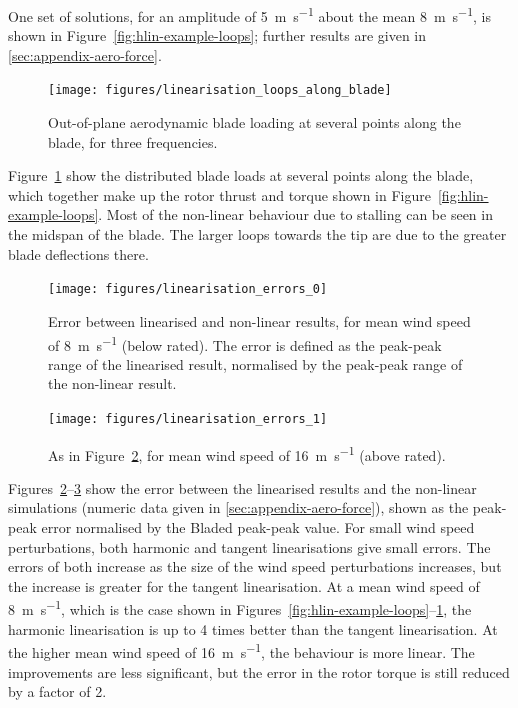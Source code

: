 \documentclass[a4paper,preprint]{elsarticle}
\begin{document}
One set of solutions, for an amplitude of \SI{5}{\metre\per\second} about the
mean \SI{8}{\metre\per\second}, is shown in Figure~\ref{fig:hlin-example-loops};
further results are given in \ref{sec:appendix-aero-force}.

\begin{figure}
  \centering
  \texttt{[image: figures/linearisation\_loops\_along\_blade]}
  \caption{Out-of-plane aerodynamic blade loading at several points
    along the blade, for three frequencies.}
\label{fig:hlin-example-bladeloads}
\end{figure}

Figure~\ref{fig:hlin-example-bladeloads} show the distributed blade loads at
several points along the blade, which together make up the rotor thrust and
torque shown in Figure~\ref{fig:hlin-example-loops}. Most of the non-linear
behaviour due to stalling can be seen in the midspan of the blade. The larger
loops towards the tip are due to the greater blade deflections there.

\begin{figure}[p]
  \centering
  \hspace*{-1.5cm}\texttt{[image: figures/linearisation\_errors\_0]}
  \caption{Error between linearised and non-linear results, for mean
    wind speed of \SI{8}{\metre\per\second} (below rated). The error
    is defined as the peak-peak range of the linearised result,
    normalised by the peak-peak range of the non-linear result.}
\label{fig:hlin-errors-rms-1}
\end{figure}
\begin{figure}[p]
  \centering
  \hspace*{-1.5cm}\texttt{[image: figures/linearisation\_errors\_1]}
  \caption{As in Figure~\ref{fig:hlin-errors-rms-1}, for mean wind speed of
    \SI{16}{\metre\per\second} (above rated).}
\label{fig:hlin-errors-rms-2}
\end{figure}

Figures~\ref{fig:hlin-errors-rms-1}--\ref{fig:hlin-errors-rms-2} show the error
between the linearised results and the non-linear simulations (numeric data given
in \ref{sec:appendix-aero-force}), shown as the peak-peak error normalised by
the Bladed peak-peak value. For small wind speed perturbations, both harmonic
and tangent linearisations give small errors. The errors of both increase as the
size of the wind speed perturbations increases, but the increase is greater for
the tangent linearisation. At a mean wind speed of \SI{8}{\metre\per\second},
which is the case shown in
Figures~\ref{fig:hlin-example-loops}--\ref{fig:hlin-example-bladeloads}, the
harmonic linearisation is up to \num{4} times better than the tangent
linearisation. At the higher mean wind speed of \SI{16}{\metre\per\second}, the
behaviour is more linear. The improvements are less significant, but the error
in the rotor torque is still reduced by a factor of \num{2}.
\end{document}
